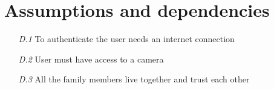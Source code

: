 \section{Assumptions and dependencies}
\begin{itemize}
    \item [\textit{D.1}] To authenticate the user needs an internet connection
    \item [\textit{D.2}] User must have access to a camera
    \item [\textit{D.3}] All the family members live together and trust each other
   
\end{itemize}


\def\fillandplacepagenumber{%
 \par\pagestyle{empty}%
\vbox to 0pt{\vss}\vfill
\vbox to 0pt{\baselineskip0pt
   \hbox to\linewidth{\hss}%
   \setlength{\footskip}{70pt}
   \baselineskip\footskip
   \hbox to\linewidth{%
     \hfil\thepage\hfil}\vss}}



